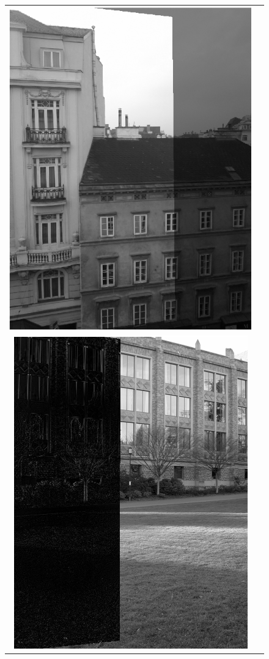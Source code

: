 \begin{figure}[h]
\begin{tabular}{cc}
	\includegraphics[width=\mywidth]{figures/overlay1.png} \\
	\includegraphics[width=\mywidth]{figures/diff2.png} &

\end{tabular}
\end{figure}
